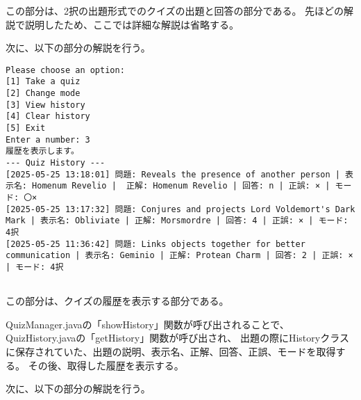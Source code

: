 \documentclass[uplatex,dvipdfmx,a4paper]{jsarticle}
\begin{document}
\par この部分は、2択の出題形式でのクイズの出題と回答の部分である。
先ほどの解説で説明したため、ここでは詳細な解説は省略する。
\par 次に、以下の部分の解説を行う。
\begin{lstlisting}[style=result]
  Please choose an option:
[1] Take a quiz
[2] Change mode
[3] View history
[4] Clear history
[5] Exit
Enter a number: 3
履歴を表示します。
--- Quiz History ---
[2025-05-25 13:18:01] 問題: Reveals the presence of another person | 表示名: Homenum Revelio |  正解: Homenum Revelio | 回答: n | 正誤: × | モード: 〇×
[2025-05-25 13:17:32] 問題: Conjures and projects Lord Voldemort's Dark Mark | 表示名: Obliviate | 正解: Morsmordre | 回答: 4 | 正誤: × | モード: 4択
[2025-05-25 11:36:42] 問題: Links objects together for better communication | 表示名: Geminio | 正解: Protean Charm | 回答: 2 | 正誤: × | モード: 4択


\end{lstlisting}
\par この部分は、クイズの履歴を表示する部分である。
\par QuizManager.javaの「showHistory」関数が呼び出されることで、QuizHistory.javaの「getHistory」関数が呼び出され、
出題の際にHistoryクラスに保存されていた、出題の説明、表示名、正解、回答、正誤、モードを取得する。
その後、取得した履歴を表示する。
\par 次に、以下の部分の解説を行う。
\end{document}
